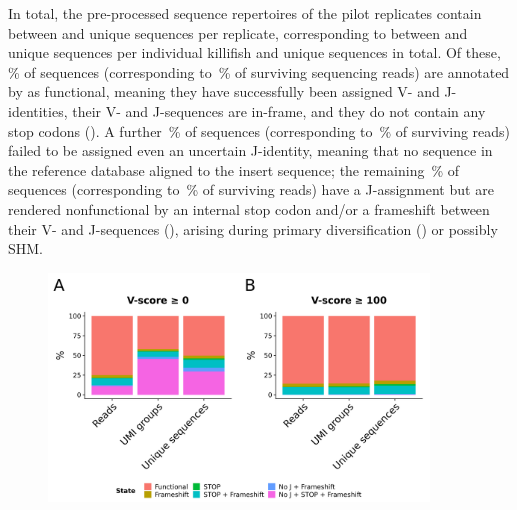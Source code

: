 In total, the pre-processed sequence repertoires of the pilot replicates contain between  and  unique sequences per replicate, corresponding to between  and  unique sequences per individual killifish and  unique sequences in total. Of these, \,\% of sequences (corresponding to \,\% of surviving sequencing reads) are annotated by  as functional, meaning they have successfully been assigned V- and J-identities, their V- and J-sequences are in-frame, and they do not contain any stop codons (). A further \,\% of sequences (corresponding to \,\% of surviving reads) failed to be assigned even an uncertain J-identity, meaning that no \jh sequence in the reference database aligned to the insert sequence; the remaining \,\% of sequences (corresponding to \,\% of surviving reads) have a J-assignment but are rendered nonfunctional by an internal stop codon and/or a frameshift between their V- and J-sequences (), arising during primary diversification () or possibly SHM.

\begin{figure}
\centering
\includegraphics[width = 0.9\textwidth]{_Figures/png/pilot-functional-prop}
\begin{subfigure}{0em}
\label{fig:igseq-pilot-functional-prop-a}
\end{subfigure}
\begin{subfigure}{0em}
\label{fig:igseq-pilot-functional-prop-b}
\end{subfigure}
\label{fig:igseq-pilot-functional-prop}
\end{figure}

